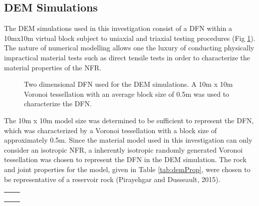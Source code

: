 \subsection{DEM Simulations}

The DEM simulations used in this investigation consist of a DFN within
a 10mx10m virtual block subject to uniaxial and triaxial testing
procedures (Fig \ref{fig:vorDFN}). The nature of numerical modelling
allows one the luxury of conducting physically impractical material
tests such as direct tensile tests in order to characterize the material
properties of the NFR.

\begin{figure}
\label{fig:vorDFN} \caption{Two dimensional DFN used for the DEM simulations. A 10m x 10m Voronoi
tessellation with an average block size of 0.5m was used to characterize
the DFN.}
\end{figure}


The 10m x 10m model size was determined to be sufficient to represent
the DFN, which was characterized by a Voronoi tessellation with a
block size of approximately 0.5m. Since the material model used in
this investigation can only consider an isotropic NFR, a inherently
isotropic randomly generated Voronoi tessellation was chosen to represent
the DFN in the DEM simulation. The rock and joint properties for the
model, given in Table \ref{tab:demProp}, were chosen to be representative
of a reservoir rock (Pirayehgar and Dusseault, 2015).

\begin{table} 
    \begin{tabular}{ c c }
         &  \\ 
         &  \\ 
         &  \\ 
    \end{tabular} 
\end{table}


